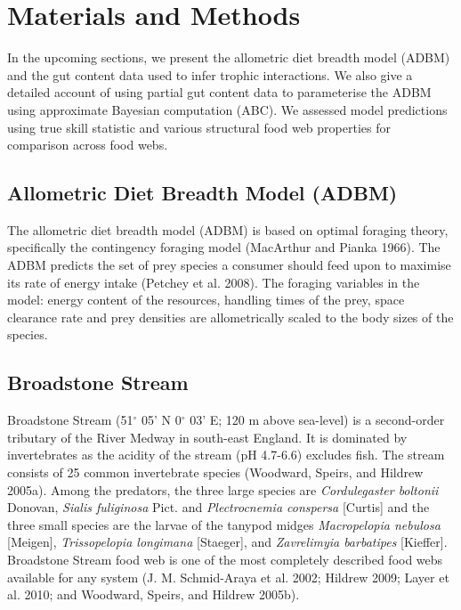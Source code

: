 \documentclass{article}
\begin{document}
\hypertarget{materials-and-methods}{%
\section{Materials and Methods}\label{materials-and-methods}}

In the upcoming sections, we present the allometric diet breadth model
(ADBM) and the gut content data used to infer trophic interactions. We
also give a detailed account of using partial gut content data to
parameterise the ADBM using approximate Bayesian computation (ABC). We
assessed model predictions using true skill statistic and various
structural food web properties for comparison across food webs.

\hypertarget{allometric-diet-breadth-model-adbm}{%
\subsection{Allometric Diet Breadth Model
(ADBM)}\label{allometric-diet-breadth-model-adbm}}

The allometric diet breadth model (ADBM) is based on optimal foraging
theory, specifically the contingency foraging model (MacArthur and
Pianka 1966). The ADBM predicts the set of prey species a consumer
should feed upon to maximise its rate of energy intake (Petchey et al.
2008). The foraging variables in the model: energy content of the
resources, handling times of the prey, space clearance rate and prey
densities are allometrically scaled to the body sizes of the species.

\hypertarget{broadstone-stream}{%
\subsection{Broadstone Stream}\label{broadstone-stream}}

Broadstone Stream (51\(^\circ\) 05' N 0\(^\circ\) 03' E; 120 m above
sea-level) is a second-order tributary of the River Medway in south-east
England. It is dominated by invertebrates as the acidity of the stream
(pH 4.7-6.6) excludes fish. The stream consists of 25 common
invertebrate species (Woodward, Speirs, and Hildrew 2005a). Among the
predators, the three large species are \emph{Cordulegaster boltonii}
Donovan, \emph{Sialis fuliginosa} Pict. and \emph{Plectrocnemia
conspersa} {[}Curtis{]} and the three small species are the larvae of
the tanypod midges \emph{Macropelopia nebulosa} {[}Meigen{]},
\emph{Trissopelopia longimana} {[}Staeger{]}, and \emph{Zavrelimyia
barbatipes} {[}Kieffer{]}. Broadstone Stream food web is one of the most
completely described food webs available for any system (J. M.
Schmid-Araya et al. 2002; Hildrew 2009; Layer et al. 2010; and Woodward,
Speirs, and Hildrew 2005b).
\end{document}
